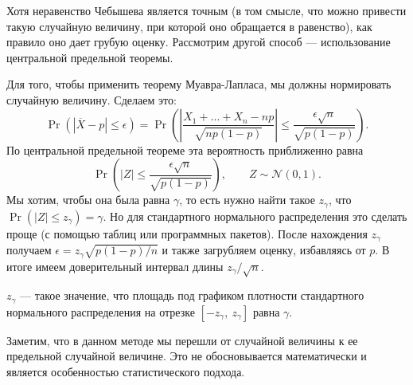 Хотя неравенство Чебышева является точным (в том смысле, что можно привести такую случайную величину, при которой оно обращается в равенство), как правило оно дает грубую оценку.
Рассмотрим другой способ --- использование центральной предельной теоремы.

Для того, чтобы применить теорему Муавра-Лапласа, мы должны нормировать случайную величину. Сделаем это:
\[
    \Pr(|\overline{X} - p| \leqslant \epsilon) = \Pr\left( \left|\frac{X_1 + \ldots + X_n - np}{\sqrt{np(1-p)}}\right| \leqslant \frac{\epsilon\sqrt{n}}{\sqrt{p(1-p)}} \right).
\]
По центральной предельной теореме эта вероятность приближенно равна
\[
    \Pr\left(|Z| \leqslant \frac{\epsilon\sqrt{n}}{\sqrt{p(1-p)}} \right), \qquad Z \sim \mathcal{N}(0, 1).
\]
Мы хотим, чтобы она была равна $\gamma$, то есть нужно найти такое $z_{\gamma}$, что $\Pr(|Z| \leqslant z_{\gamma}) = \gamma$.
Но для стандартного нормального распределения это сделать проще (с помощью таблиц или программных пакетов).
После нахождения $z_{\gamma}$ получаем $\epsilon = z_{\gamma}\sqrt{p(1-p) / n}$ и также загрубляем оценку, избавляясь от $p$.
В итоге имеем доверительный интервал длины $z_{\gamma} / \sqrt{n}$.

\begin{remark}
    $z_{\gamma}$ --- такое значение, что площадь под графиком плотности стандартного нормального распределения на отрезке $[-z_{\gamma},\ z_{\gamma}]$ равна $\gamma$. 
\end{remark}

Заметим, что в данном методе мы перешли от случайной величины к ее предельной случайной величине.
Это не обосновывается математически и является особенностью статистического подхода.

